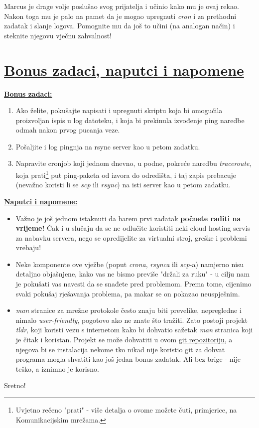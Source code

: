 \documentclass[12pt,a4paper]{article}
\begin{document}
		\par Marcus je drage volje poslušao svog prijatelja i učinio kako mu je ovaj rekao. Nakon toga mu je palo na pamet da je mogao upregnuti \textit{cron} i za prethodni zadatak i slanje logova. Pomognite mu da još to učini (na analogan način) i steknite njegovu vječnu zahvalnost!

	\newpage

	\section*{\underline{Bonus zadaci, naputci i napomene}}
		\underline{\textbf{Bonus zadaci:}}
		\begin{enumerate}
			\item Ako želite, pokušajte napisati i upregnuti skriptu koja bi omogućila proizvoljan ispis u log datoteku, i koja bi prekinula izvođenje ping naredbe odmah nakon prvog pucanja veze.
			\item Pošaljite i log pingnja na rsync server kao u petom zadatku.
			\item Napravite cronjob koji jednom dnevno, u podne, pokreće naredbu \textit{traceroute}, koja prati\footnote{Uvjetno rečeno "prati" - više detalja o ovome možete čuti, primjerice, na Komunikacijskim mrežama.} put ping-paketa od izvora do odredišta, i taj zapis prebacuje (nevažno koristi li se \textit{scp} ili \textit{rsync}) na isti server kao u petom zadatku.
		\end{enumerate}

		\vfill
		\underline{\textbf{Naputci i napomene: }}
		\begin{itemize}
			\item Važno je još jednom istaknuti da barem prvi zadatak \textbf{počnete raditi na vrijeme!} Čak i u slučaju da se ne odlučite koristiti neki cloud hosting servis za nabavku servera, nego se opredijelite za virtualni stroj, greške i problemi vrebaju!
			\item Neke komponente ove vježbe (poput \textit{crona}, \textit{rsynca} ili \textit{scp}-a) namjerno nisu detaljno objašnjene, kako vas ne bismo previše "držali za ruku" - u cilju nam je pokušati vas navesti da se snađete pred problemom. Prema tome, cijenimo svaki pokušaj rješavanja problema, pa makar se on pokazao neuspješnim.
			\item \textit{man} stranice za mrežne protokole često znaju biti prevelike, nepregledne i nimalo \textit{user-friendly}, pogotovo ako ne znate što tražiti. Zato postoji projekt \textit{tldr}, koji koristi vezu s internetom kako bi dohvatio sažetak \textit{man} stranica koji je čitak i koristan. Projekt se može dohvatiti u ovom \href{https://github.com/tldr-pages/tldr}{git repozitoriju}, a njegova bi se instalacija nekome tko nikad nije koristio git za dohvat programa mogla shvatiti kao još jedan bonus zadatak. Ali bez brige - nije teško, a iznimno je korisno.
		\end{itemize}
		Sretno!
\end{document}
